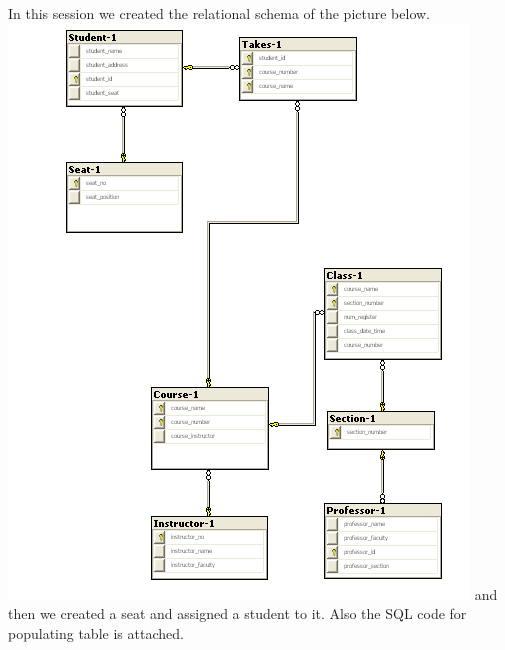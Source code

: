 \documentclass[12pt]{article}
\begin{document}
In this session we created the relational schema of the picture below.
\includegraphics[scale=0.5]{phase-1.bmp}
    and then we created a seat and assigned a student to it. Also the SQL code for
populating table is attached.
\end{document}
